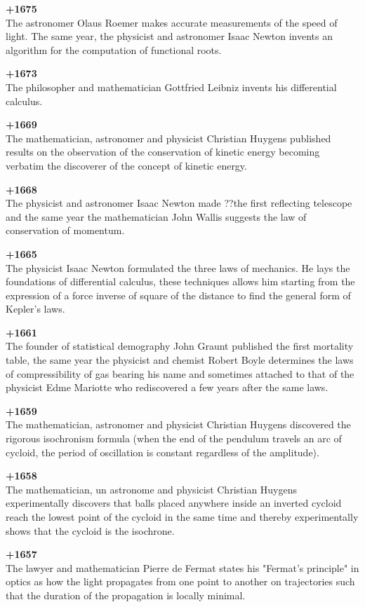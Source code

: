 \textbf{+1675}\\
The astronomer Olaus Roemer makes accurate measurements of the speed of light. The same year, the physicist and astronomer Isaac Newton invents an algorithm for the computation of functional roots.

\textbf{+1673}\\
The philosopher and mathematician Gottfried Leibniz invents his differential calculus. 

\textbf{+1669}\\
The mathematician, astronomer and physicist Christian Huygens published results on the observation of the conservation of kinetic energy becoming verbatim the discoverer of the concept of kinetic energy.

\pagebreak
\textbf{+1668}\\
The physicist and astronomer Isaac Newton made ??the first reflecting telescope and the same year the mathematician John Wallis suggests the law of conservation of momentum.

\textbf{+1665}\\
The physicist Isaac Newton formulated the three laws of mechanics. He lays the foundations of differential calculus, these techniques allows him starting from the expression of a force inverse of square of the distance to find the general form of Kepler's laws.

\textbf{+1661}\\
The founder of statistical demography John Graunt published the first mortality table, the same year the physicist and chemist Robert Boyle determines the laws of compressibility of gas bearing his name and sometimes attached to that of the physicist Edme Mariotte who rediscovered a few years after the same laws.

\textbf{+1659}\\
The mathematician, astronomer and physicist Christian Huygens discovered the rigorous isochronism formula (when the end of the pendulum travels an arc of cycloid, the period of oscillation is constant regardless of the amplitude).

\textbf{+1658}\\
The mathematician, un astronome and physicist Christian Huygens experimentally discovers that balls placed anywhere inside an inverted cycloid reach the lowest point of the cycloid in the same time and thereby experimentally shows that the cycloid is the isochrone.

\textbf{+1657}\\
The lawyer and mathematician Pierre de Fermat states his "Fermat's principle" in optics as how the light propagates from one point to another on trajectories such that the duration of the propagation is locally minimal.

